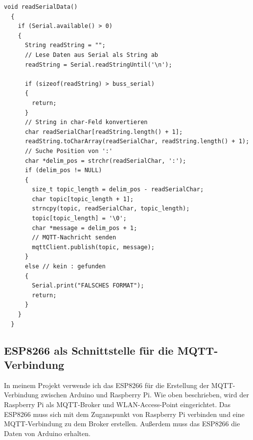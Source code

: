 \documentclass[12pt, letterpaper]{article}
\begin{document}
\begin{lstlisting}[frame=single, style=cpp,caption={ESP8266: readSerialData()}]
  void readSerialData()
  {
    if (Serial.available() > 0)
    {
      String readString = "";
      // Lese Daten aus Serial als String ab
      readString = Serial.readStringUntil('\n');
      
      if (sizeof(readString) > buss_serial)
      {
        return;
      }
      // String in char-Feld konvertieren
      char readSerialChar[readString.length() + 1];
      readString.toCharArray(readSerialChar, readString.length() + 1);
      // Suche Position von ':'
      char *delim_pos = strchr(readSerialChar, ':');
      if (delim_pos != NULL)
      {
        size_t topic_length = delim_pos - readSerialChar;
        char topic[topic_length + 1];
        strncpy(topic, readSerialChar, topic_length);
        topic[topic_length] = '\0';
        char *message = delim_pos + 1;
        // MQTT-Nachricht senden
        mqttClient.publish(topic, message);
      }
      else // kein : gefunden
      {
        Serial.print("FALSCHES FORMAT");
        return;
      }
    }
  }
\end{lstlisting}
\subsection[ESP8266-Raspberry Pi]{ESP8266 als Schnittstelle für die MQTT-Verbindung}
\par In meinem Projekt verwende ich das ESP8266 für die Erstellung der MQTT-Verbindung zwischen Arduino und Raspberry Pi. Wie oben beschrieben, wird der Raspberry Pi als MQTT-Broker und WLAN-Access-Point eingerichtet. Das ESP8266 muss sich mit dem Zuganspunkt von Raspberry Pi verbinden und eine MQTT-Verbindung zu dem Broker erstellen. Außerdem muss das ESP8266 die Daten von Arduino erhalten.
\end{document}
